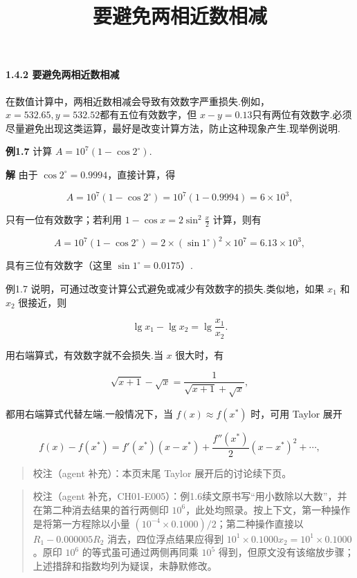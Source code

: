 \documentclass[
  10pt,
  fontset=fandol]{ctexart}
\title{要避免两相近数相减}
\author{}
\date{}
\begin{document}
\maketitle

\paragraph{1.4.2 要避免两相近数相减}\label{ux8981ux907fux514dux4e24ux76f8ux8fd1ux6570ux76f8ux51cf}

在数值计算中，两相近数相减会导致有效数字严重损失.例如，\(x=532.65, y=532.52\)都有五位有效数字，但 \(x-y=0.13\)只有两位有效数字.必须尽量避免出现这类运算，最好是改变计算方法，防止这种现象产生.现举例说明.

\textbf{例1.7} 计算 \(A=10^7(1-\cos 2^\circ)\).

\textbf{解} 由于 \(\cos 2^\circ=0.9994\)，直接计算，得

\[
A=10^7(1-\cos 2^\circ)=10^7(1-0.9994)=6 \times 10^3,
\]

只有一位有效数字；若利用 \(1-\cos x=2\sin^2\frac{x}{2}\) 计算，则有

\[
A=10^7(1-\cos 2^\circ)=2 \times (\sin 1^\circ)^2 \times 10^7=6.13 \times 10^3,
\]

具有三位有效数字（这里 \(\sin 1^\circ=0.0175\)）.

例1.7 说明，可通过改变计算公式避免或减少有效数字的损失.类似地，如果 \(x_1\) 和 \(x_2\) 很接近，则

\[
\lg x_1-\lg x_2=\lg \frac{x_1}{x_2}.
\]

用右端算式，有效数字就不会损失.当 \(x\) 很大时，有

\[
\sqrt{x+1}-\sqrt{x}=\frac{1}{\sqrt{x+1}+\sqrt{x}},
\]

都用右端算式代替左端.一般情况下，当 \(f(x)\approx f(x^*)\) 时，可用 Taylor 展开

\[
f(x)-f(x^*)=f'(x^*) (x-x^*)+\frac{f''(x^*)}{2} (x-x^*)^2+\cdots,
\]

\begin{quote}
校注（agent 补充）：本页末尾 Taylor 展开后的讨论续下页。
\end{quote}

\begin{quote}
校注（agent 补充，CH01-E005）：例1.6续文原书写``用小数除以大数''，并在第二种消去结果的首行两侧印 \(10^6\)，此处均照录。按上下文，第一种操作是将第一方程除以小量 \((10^{-4}\times0.1000)/2\)；第二种操作直接以 \(R_1-0.000005R_2\) 消去，四位浮点结果应得到 \(10^1\times0.1000x_2=10^1\times0.1000\)。原印 \(10^6\) 的等式虽可通过两侧再同乘 \(10^5\) 得到，但原文没有该缩放步骤；上述措辞和指数均列为疑误，未静默修改。
\end{quote}
\end{document}
